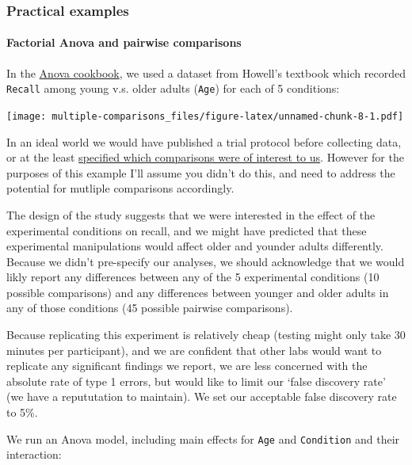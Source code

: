 \documentclass[]{article}
\let\oldparagraph\paragraph
\renewcommand{\paragraph}[1]{\oldparagraph{#1}\mbox{}}
\theoremstyle{definition}
\theoremstyle{definition}
\theoremstyle{definition}
\theoremstyle{remark}
\begin{document}
\hypertarget{contrasts-examples}{\subsubsection*{Practical
examples}\label{contrasts-examples}}

\paragraph{Factorial Anova and pairwise
comparisons}\label{factorial-anova-and-pairwise-comparisons}

In the \protect\hyperlink{howell-factorial-example}{Anova cookbook}, we
used a dataset from Howell's textbook which recorded \texttt{Recall}
among young v.s. older adults (\texttt{Age}) for each of 5 conditions:

\texttt{[image: multiple-comparisons\_files/figure-latex/unnamed-chunk-8-1.pdf]}

In an ideal world we would have published a trial protocol before
collecting data, or at the least
\protect\hyperlink{register-predictions}{specified which comparisons
were of interest to us}. However for the purposes of this example I'll
assume you didn't do this, and need to address the potential for
mutliple comparisons accordingly.

The design of the study suggests that we were interested in the effect
of the experimental conditions on recall, and we might have predicted
that these experimental manipulations would affect older and younder
adults differently. Because we didn't pre-specify our analyses, we
should acknowledge that we would likly report any differences between
any of the 5 experimental conditions (10 possible comparisons) and any
differences between younger and older adults in any of those conditions
(45 possible pairwise comparisons).

Because replicating this experiment is relatively cheap (testing might
only take 30 minutes per participant), and we are confident that other
labs would want to replicate any significant findings we report, we are
less concerned with the absolute rate of type 1 errors, but would like
to limit our `false discovery rate' (we have a repututation to
maintain). We set our acceptable false discovery rate to 5\%.

We run an Anova model, including main effects for \texttt{Age} and
\texttt{Condition} and their interaction:
\end{document}
